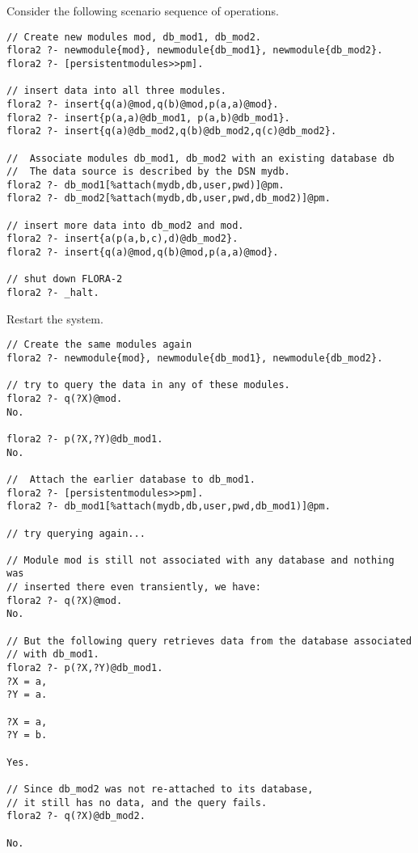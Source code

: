 Consider the following scenario sequence of operations.

\begin{verbatim}
// Create new modules mod, db_mod1, db_mod2.
flora2 ?- newmodule{mod}, newmodule{db_mod1}, newmodule{db_mod2}.
flora2 ?- [persistentmodules>>pm].

// insert data into all three modules.
flora2 ?- insert{q(a)@mod,q(b)@mod,p(a,a)@mod}.
flora2 ?- insert{p(a,a)@db_mod1, p(a,b)@db_mod1}.
flora2 ?- insert{q(a)@db_mod2,q(b)@db_mod2,q(c)@db_mod2}.

//  Associate modules db_mod1, db_mod2 with an existing database db
//  The data source is described by the DSN mydb.
flora2 ?- db_mod1[%attach(mydb,db,user,pwd)]@pm.
flora2 ?- db_mod2[%attach(mydb,db,user,pwd,db_mod2)]@pm.

// insert more data into db_mod2 and mod.
flora2 ?- insert{a(p(a,b,c),d)@db_mod2}.
flora2 ?- insert{q(a)@mod,q(b)@mod,p(a,a)@mod}.

// shut down FLORA-2
flora2 ?- _halt.
\end{verbatim}

\noindent
Restart the \FLORA system.

\begin{verbatim}
// Create the same modules again
flora2 ?- newmodule{mod}, newmodule{db_mod1}, newmodule{db_mod2}.

// try to query the data in any of these modules.
flora2 ?- q(?X)@mod.
No.

flora2 ?- p(?X,?Y)@db_mod1.
No.

//  Attach the earlier database to db_mod1.
flora2 ?- [persistentmodules>>pm].
flora2 ?- db_mod1[%attach(mydb,db,user,pwd,db_mod1)]@pm.

// try querying again...

// Module mod is still not associated with any database and nothing was
// inserted there even transiently, we have:
flora2 ?- q(?X)@mod.
No.

// But the following query retrieves data from the database associated
// with db_mod1.
flora2 ?- p(?X,?Y)@db_mod1.
?X = a,
?Y = a.

?X = a,
?Y = b.

Yes.

// Since db_mod2 was not re-attached to its database,
// it still has no data, and the query fails.
flora2 ?- q(?X)@db_mod2.

No.
\end{verbatim}




